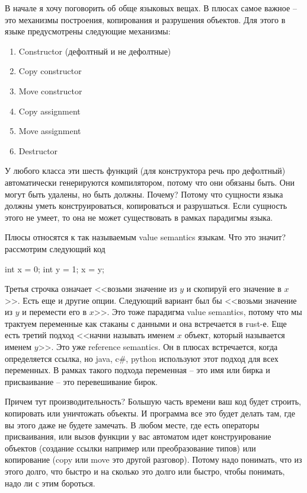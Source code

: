 \documentclass{article}
\begin{document}
В начале я хочу поговорить об обще языковых вещах. В плюсах самое важное -- это механизмы построения, копирования и разрушения объектов. Для этого в языке предусмотрены следующие механизмы:
\begin{enumerate}
\item Constructor (дефолтный и не дефолтные)
\item Copy constructor
\item Move constructor
\item Copy assignment
\item Move assignment
\item Destructor
\end{enumerate}
У любого класса эти шесть функций (для конструктора речь про дефолтный) автоматически генерируются компилятором, потому что они обязаны быть. Они могут быть удалены, но быть должны. Почему? Потому что сущности языка должны уметь конструироваться, копироваться и разрушаться. Если сущность этого не умеет, то она не может существовать в рамках парадигмы языка.

Плюсы относятся к так называемым  value semantics языкам. Что это значит? рассмотрим следующий код
\begin{cppcode}
int x = 0;
int y = 1;
x = y;
\end{cppcode}
Третья строчка означает <<возьми значение из $y$ и скопируй его значение в $x$>>. Есть еще и другие опции. Следующий вариант был бы <<возьми значение из $y$ и перемести его в $x$>>. Это тоже парадигма value semantics, потому что мы трактуем переменные как стаканы с данными и она встречается в rust-е. Еще есть третий подход <<начни называть именем $x$ объект, который называется именем $y$>>. Это уже reference semantics. Он в плюсах встречается, когда определяется ссылка, но java, c\#, python используют этот подход для всех переменных. В рамках такого подхода переменная -- это имя или бирка и присваивание -- это перевешивание бирок.

Причем тут производительность? Большую часть времени ваш код будет строить, копировать или уничтожать объекты. И программа все это будет делать там, где вы этого даже не будете замечать. В любом месте, где есть операторы присваивания, или вызов функции у вас автоматом идет конструирование объектов (создание ссылки например или преобразование типов) или копирование (copy или move это другой разговор). Потому надо понимать, что из этого долго, что быстро и на сколько это долго или быстро, чтобы понимать, надо ли с этим бороться.
\end{document}
